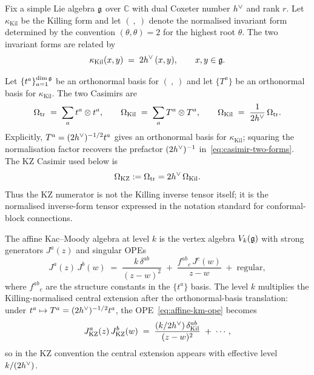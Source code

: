 \begin{definition}
\label{def:chern-weil-normalization-data}
Fix a simple Lie algebra $\mathfrak{g}$ over $\mathbb{C}$ with dual Coxeter
number $h^{\vee}$ and rank $r$. Let $\kappa_{\mathrm{Kil}}$ be the Killing
form and let $(\ ,\ )$ denote the normalised invariant form determined
by the convention $(\theta, \theta) = 2$ for the highest root
$\theta$. The two invariant forms are related by
\begin{equation}\label{eq:killing-trace-relation}
 \kappa_{\mathrm{Kil}}(x, y) \;=\; 2 h^{\vee}\, (x, y),
 \qquad x, y \in \mathfrak{g}.
\end{equation}

Let $\{t^a\}_{a=1}^{\dim\mathfrak{g}}$ be an orthonormal basis for $(\ ,\ )$
and let $\{T^a\}$ be an orthonormal basis for
$\kappa_{\mathrm{Kil}}$. The two Casimirs are
\begin{equation}\label{eq:casimir-two-forms}
 \Omega_{\mathrm{tr}} \;=\; \sum_a t^a \otimes t^a,
 \qquad
 \Omega_{\mathrm{Kil}} \;=\; \sum_a T^a \otimes T^a,
 \qquad
 \Omega_{\mathrm{Kil}} \;=\; \frac{1}{2 h^{\vee}}\,\Omega_{\mathrm{tr}}.
\end{equation}
Explicitly, $T^a = (2h^{\vee})^{-1/2} t^a$ gives an orthonormal basis
for $\kappa_{\mathrm{Kil}}$; squaring the normalisation factor recovers
the prefactor $(2h^{\vee})^{-1}$ in~\eqref{eq:casimir-two-forms}. The KZ
Casimir used below is
\begin{equation}\label{eq:kz-casimir-normalization}
 \Omega_{\mathrm{KZ}} := \Omega_{\mathrm{tr}} = 2h^{\vee}\,\Omega_{\mathrm{Kil}}.
\end{equation}
Thus the KZ numerator is not the Killing inverse tensor itself; it is
the normalised inverse-form tensor expressed in the notation standard
for conformal-block connections.

The affine Kac--Moody algebra at level $k$ is the vertex algebra
$V_k(\mathfrak{g})$ with strong generators $J^a(z)$ and singular OPEs
\begin{equation}\label{eq:affine-km-ope}
 J^a(z)\,J^b(w) \;=\;
 \frac{k\,\delta^{ab}}{(z - w)^2}
 \;+\;
 \frac{f^{ab}{}_c\,J^c(w)}{z - w}
 \;+\;\mathrm{regular},
\end{equation}
where $f^{ab}{}_c$ are the structure constants in the $\{t^a\}$
basis. The level $k$ multiplies the Killing-normalised central
extension after the orthonormal-basis translation: under $t^a \mapsto
T^a = (2h^{\vee})^{-1/2} t^a$, the OPE~\eqref{eq:affine-km-ope} becomes
\[
 J^a_{\mathrm{KZ}}(z)\,J^b_{\mathrm{KZ}}(w)
 \;=\;
 \frac{(k / 2h^{\vee})\,\delta^{ab}_{\mathrm{Kil}}}{(z - w)^2}
 \;+\;\cdots,
\]
so in the KZ convention the central extension appears with effective
level $k/(2h^{\vee})$.
\end{definition}

